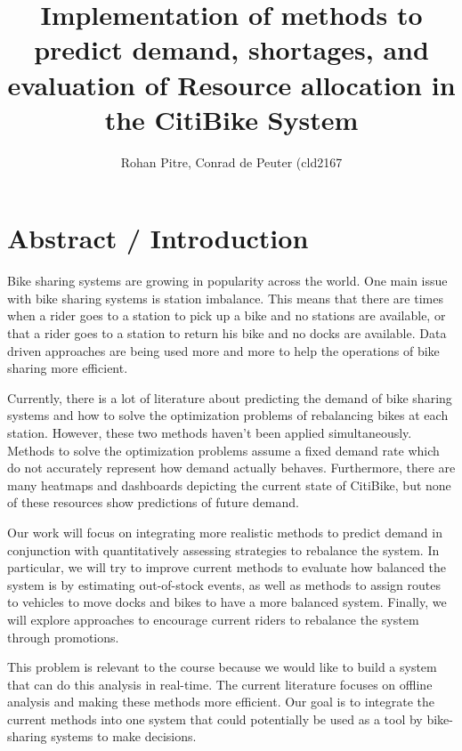 \documentclass{proc}
\begin{document}
\title{Implementation of methods to predict demand, shortages, and evaluation of Resource allocation in the CitiBike System}

\author{Rohan Pitre, Conrad de Peuter (cld2167}

\maketitle

\section{Abstract / Introduction}



Bike sharing systems are growing in popularity across the world. One main issue with bike sharing systems is station imbalance. This means that there are times when a rider goes to a station to pick up a bike and no stations are available, or that a rider goes to a station to return his bike and no docks are available. Data driven approaches are being used more and more to help the operations of bike sharing more efficient. 

Currently, there is a lot of literature about predicting the demand of bike sharing systems and how to solve the optimization problems of rebalancing bikes at each station. However, these two methods haven't been applied simultaneously. Methods to solve the optimization problems assume a fixed demand rate which do not accurately represent how demand actually behaves. Furthermore, there are many heatmaps and dashboards depicting the current state of CitiBike, but none of these resources show predictions of future demand.

Our work will focus on integrating more realistic methods to predict demand in conjunction with quantitatively assessing strategies to rebalance the system. In particular, we will try to improve current methods to evaluate how balanced the system is by estimating out-of-stock events, as well as methods to assign routes to vehicles to move docks and bikes to have a more balanced system. Finally, we will explore approaches to encourage current riders to rebalance the system through promotions.

This problem is relevant to the course because we would like to build a system that can do this analysis in real-time. The current literature focuses on offline analysis and making these methods more efficient. Our goal is to integrate the current methods into one system that could potentially be used as a tool by bike-sharing systems to make decisions. 
\end{document}
